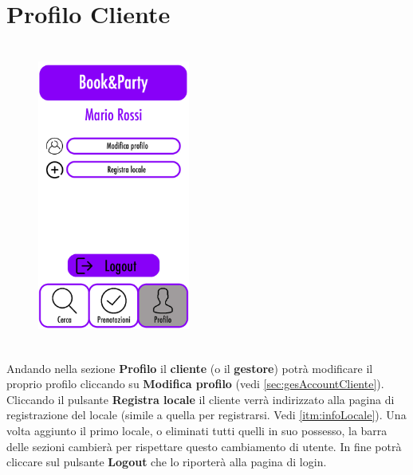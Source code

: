 \newpage
\section{Profilo Cliente}
\begin{figure}[h]
    \centering
    \includegraphics[width=5cm, height=10cm]{mockup/09-profilo-cliente.jpg}
    \label{fig:profiloCliente}
\end{figure}

Andando nella sezione \textbf{Profilo} il \textbf{cliente} (o il \textbf{gestore}) potrà 
modificare il proprio profilo cliccando su \textbf{Modifica profilo} (vedi 
\ref{sec:gesAccountCliente}). Cliccando il pulsante \textbf{Registra locale} il cliente 
verrà indirizzato alla pagina di registrazione del locale (simile a quella per registrarsi. Vedi 
\ref{itm:infoLocale}). Una volta aggiunto il primo locale, o eliminati tutti quelli in suo 
possesso, la barra delle sezioni cambierà per rispettare questo cambiamento di utente. In fine 
potrà cliccare sul pulsante \textbf{Logout} che lo riporterà alla pagina di login.

\newpage
